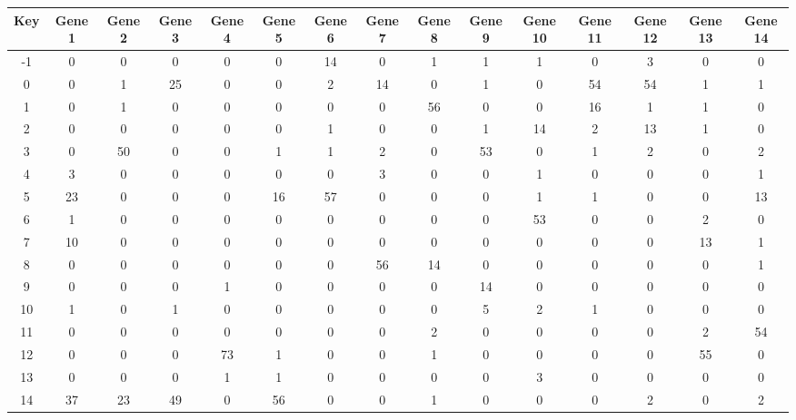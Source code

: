 \begin{tabular}{|c|c|c|c|c|c|c|c|c|c|c|c|c|c|c|}
\hline
Key & Gene 1 & Gene 2 & Gene 3 & Gene 4 & Gene 5 & Gene 6 & Gene 7 & Gene 8 & Gene 9 & Gene 10 & Gene 11 & Gene 12 & Gene 13 & Gene 14 \\
\hline
-1 & 0 & 0 & 0 & 0 & 0 & 14 & 0 & 1 & 1 & 1 & 0 & 3 & 0 & 0 \\
0 & 0 & 1 & 25 & 0 & 0 & 2 & 14 & 0 & 1 & 0 & 54 & 54 & 1 & 1 \\
1 & 0 & 1 & 0 & 0 & 0 & 0 & 0 & 56 & 0 & 0 & 16 & 1 & 1 & 0 \\
2 & 0 & 0 & 0 & 0 & 0 & 1 & 0 & 0 & 1 & 14 & 2 & 13 & 1 & 0 \\
3 & 0 & 50 & 0 & 0 & 1 & 1 & 2 & 0 & 53 & 0 & 1 & 2 & 0 & 2 \\
4 & 3 & 0 & 0 & 0 & 0 & 0 & 3 & 0 & 0 & 1 & 0 & 0 & 0 & 1 \\
5 & 23 & 0 & 0 & 0 & 16 & 57 & 0 & 0 & 0 & 1 & 1 & 0 & 0 & 13 \\
6 & 1 & 0 & 0 & 0 & 0 & 0 & 0 & 0 & 0 & 53 & 0 & 0 & 2 & 0 \\
7 & 10 & 0 & 0 & 0 & 0 & 0 & 0 & 0 & 0 & 0 & 0 & 0 & 13 & 1 \\
8 & 0 & 0 & 0 & 0 & 0 & 0 & 56 & 14 & 0 & 0 & 0 & 0 & 0 & 1 \\
9 & 0 & 0 & 0 & 1 & 0 & 0 & 0 & 0 & 14 & 0 & 0 & 0 & 0 & 0 \\
10 & 1 & 0 & 1 & 0 & 0 & 0 & 0 & 0 & 5 & 2 & 1 & 0 & 0 & 0 \\
11 & 0 & 0 & 0 & 0 & 0 & 0 & 0 & 2 & 0 & 0 & 0 & 0 & 2 & 54 \\
12 & 0 & 0 & 0 & 73 & 1 & 0 & 0 & 1 & 0 & 0 & 0 & 0 & 55 & 0 \\
13 & 0 & 0 & 0 & 1 & 1 & 0 & 0 & 0 & 0 & 3 & 0 & 0 & 0 & 0 \\
14 & 37 & 23 & 49 & 0 & 56 & 0 & 0 & 1 & 0 & 0 & 0 & 2 & 0 & 2 \\
\hline
\end{tabular}